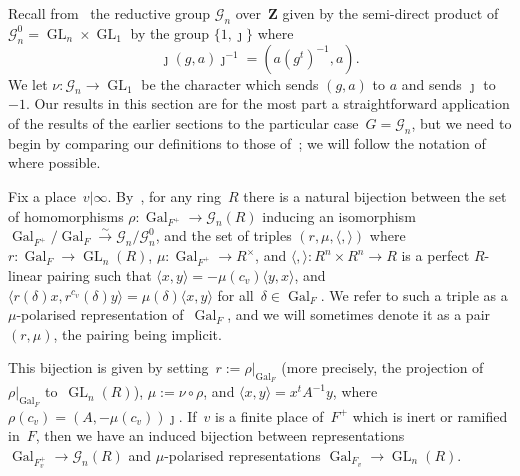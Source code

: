 \documentclass{amsart}
\renewcommand{\mathbb}{\mathbf}
\newcommand{\To}{\longrightarrow}
\newcommand{\isoto}{\stackrel{\sim}{\To}}
\theoremstyle{definition}
\theoremstyle{remark}
\newcommand{\mar}[1]{}
\newcommand{\mar}[1]{\marginpar{\raggedright\tiny squirrel #1}}
\newcommand{\Z}{\ZZ}
\newcommand{\ZZ}{{\mathbb Z}}
\newcommand{\cG}{{\mathcal G}}
\DeclareMathOperator{\Gal}{Gal}
\DeclareMathOperator{\GL}{GL}
\begin{document}

Recall from~\cite{CHT} the reductive group $\cG_n$
over~$\Z$ given by the semi-direct product of $\cG_n^0=\GL_n \times \GL_1$ by the group $\{1 , \jmath\}$
where 
\[ \jmath (g,a) \jmath^{-1}=(a(g^t)^{-1},a). \]%
We let
$\nu:\cG_n \to \GL_1$ be the character which sends $(g,a)$ to $a$ and
sends $\jmath$ to $-1$. Our results in this section are for the most
part a straightforward application of the results of the earlier
sections to the particular case~$G=\cG_n$, but we need to begin by
comparing our definitions to those of~\cite{CHT}; we will follow the
notation of~\cite{CHT} where possible.

Fix a place~$v|\infty$. By~\cite[Lem.\ 2.1.1]{CHT}, for any ring~$R$
there is a natural bijection between the set of homomorphisms
$\rho:\Gal_{F^+}\to\cG_n(R)$ inducing an isomorphism
$\Gal_{F^+}/\Gal_F\isoto\cG_n/\cG_n^0$, and the set of triples
$(r,\mu,\langle,\rangle)$ where $r:\Gal_F\to\GL_n(R)$,
$\mu:\Gal_{F^+}\to R^\times$, and $\langle,\rangle:R^n\times R^n\to R$
is a perfect $R$-linear pairing such that
$\langle x,y\rangle=-\mu(c_v)\langle y,x\rangle$, and
$\langle r(\delta)x,r^{c_v}(\delta)y\rangle=\mu(\delta)\langle
x,y\rangle$ for all~$\delta\in\Gal_F$. We refer to such a triple as a
$\mu$-polarised representation of~$\Gal_F$, and we will sometimes
denote it as a pair~$(r,\mu)$, the pairing being implicit.

This bijection is given by setting~$r:=\rho|_{\Gal_F}$ (more
precisely, the projection of~$\rho|_{\Gal_F}$ to~$\GL_n(R)$),
$\mu:=\nu\circ\rho$, and $\langle x,y\rangle=x^t A^{-1}y$,
where $\rho(c_v)=(A,-\mu(c_v))\jmath$. If~$v$ is a finite place
of~$F^+$ which is inert or ramified in~$F$, then we have an induced
bijection between representations $\Gal_{F^+_v}\to\cG_n(R)$ and
$\mu$-polarised representations $\Gal_{F_v}\to\GL_n(R)$.
\end{document}
